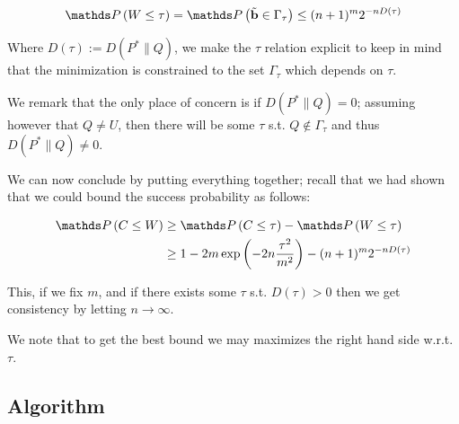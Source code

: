 \begin{equation}
    \Prob\left(W \leq \tau \right) = \Prob\left( \tilde{\mathbf{b}} \in \Gamma_\tau \right) 
    \leq (n+1)^{m} 2^{-nD\left( \tau \right)}
\end{equation}

Where $D\left( \tau \right) := D\left(P^{*} \| Q\right)$, we make the $\tau$ relation explicit to 
keep in mind that the minimization is constrained to the set $\Gamma_\tau$ which depends on $\tau$.

We remark that the only place of concern is if $D\left(P^{*} \| Q\right) = 0$; assuming however that $Q \neq U$, then 
there will be some $\tau$ s.t. $Q \notin \Gamma_\tau$ and thus $D\left(P^{*} \| Q\right) \neq 0$.

We can now conclude by putting everything together; recall that we had shown that we could bound the success probability 
as follows:



\begin{align}
    \Prob\left(C \leq W\right) &\geq \Prob\left(C \leq \tau \right) - \Prob\left(W \leq \tau \right) \\
    &\geq 1 - 2m\exp \left( -2n \frac{\tau^2}{m^2} \right) - (n+1)^{m} 2^{-nD\left( \tau \right)}
\end{align}

This, if we fix $m$, and if there exists some $\tau$ s.t. $D\left( \tau \right) > 0$ then we get consistency
by letting $n \rightarrow \infty$.

We note that to get the best bound we may maximizes the right hand side w.r.t. $\tau$.

\subsection{Algorithm}

